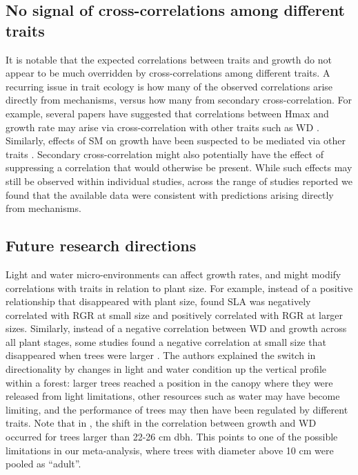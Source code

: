 \documentclass[a4paper,11pt]{article}
\begin{document}
\subsection*{No signal of cross-correlations among different traits}

It is notable that the expected correlations between traits and growth do not appear to be much overridden by cross-correlations among different traits. A recurring issue in trait ecology is how many of the observed correlations arise directly from mechanisms, versus how many from secondary cross-correlation. For example, several papers have suggested that correlations between Hmax and growth rate may arise via cross-correlation with other traits such as WD \citep{Thomas:1996do, Poorter:2006vb, Wright:2010tp}. Similarly, effects of SM on growth have been suspected to be mediated via other traits \citep{Shipley:1990js,Westoby:2002ft,Poorter:2006vb}. Secondary cross-correlation might also potentially have the effect of suppressing a correlation that would otherwise be present. While such effects may still be observed within individual studies, across the range of studies reported we found that the available data were consistent with predictions arising directly from mechanisms.

\subsection*{Future research directions}

Light and water micro-environments can affect growth rates, and might modify correlations with traits in relation to plant size. For example, instead of a positive relationship that disappeared with plant size, \citet{Iida:2014ep} found SLA was negatively correlated with RGR at small size and positively correlated with RGR at larger sizes. Similarly, instead of a negative correlation between WD and growth across all plant stages,  some studies found a negative correlation at small size that disappeared when trees were larger \citep{Iida:2014ep,Iida:2014hq}. The authors explained the switch in directionality by changes in light and water condition up the vertical profile within a forest: larger trees reached a position in the canopy where they were released from light limitations, other resources such as water may have become limiting, and the performance of trees may then have been regulated by different traits. Note that in \citet{Iida:2014hq}, the shift in the correlation between growth and WD occurred for trees larger than 22-26 cm dbh. This points to one of the possible limitations in our meta-analysis, where trees with diameter above 10 cm were pooled as ``adult''.
\end{document}
